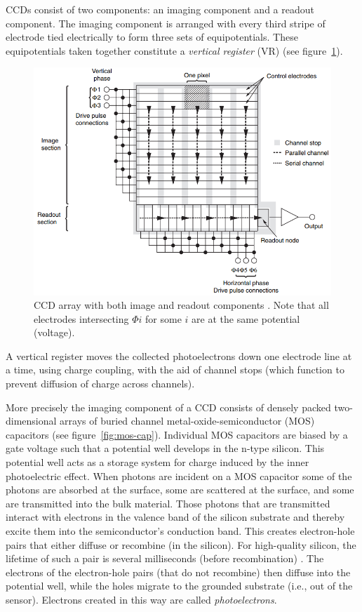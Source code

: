 CCDs consist of two components: an imaging component and a readout component.
%
The imaging component is arranged with every third stripe of electrode tied electrically to form three sets of equipotentials.
%
These equipotentials taken together constitute a \textit{vertical register} (VR) (see figure~\ref{fig:ccd-array}).
\begin{figure}[!htbp]
	\centering
	\includegraphics[width=.8\textwidth,keepaspectratio]{figures/background/ccd_array.png}
	\caption{CCD array with both image and readout components \cite{pawley1995handbook}. Note that all electrodes intersecting \(\Phi i\) for some \(i\) are at the same potential (voltage).}
	\label{fig:ccd-array}
\end{figure}
%
A vertical register moves the collected photoelectrons down one electrode line at a time, using charge coupling, with the aid of channel stops (which function to prevent diffusion of charge across channels).

More precisely the imaging component of a CCD consists of densely packed two-dimensional arrays of buried channel metal-oxide-semiconductor (MOS) capacitors (see figure~\ref{fig:mos-cap}).
%
Individual MOS capacitors are biased by a gate voltage such that a potential well develops in the n-type silicon.
%
This potential well acts as a storage system for charge induced by the inner photoelectric effect.
%
When photons are incident on a MOS capacitor some of the photons are absorbed at the surface, some are scattered at the surface, and some are transmitted into the bulk material.
%
Those photons that are transmitted interact with electrons in the valence band of the silicon substrate and thereby excite them into the semiconductor's conduction band.
%
This creates electron-hole pairs that either diffuse or recombine (in the silicon).
%
For high-quality silicon, the lifetime of such a pair is several milliseconds (before recombination) \cite{scientificccd}.
%
The electrons of the electron-hole pairs (that do not recombine) then diffuse into the potential well, while the holes migrate to the grounded substrate (i.e., out of the sensor).
%
Electrons created in this way are called \textit{photoelectrons}.

